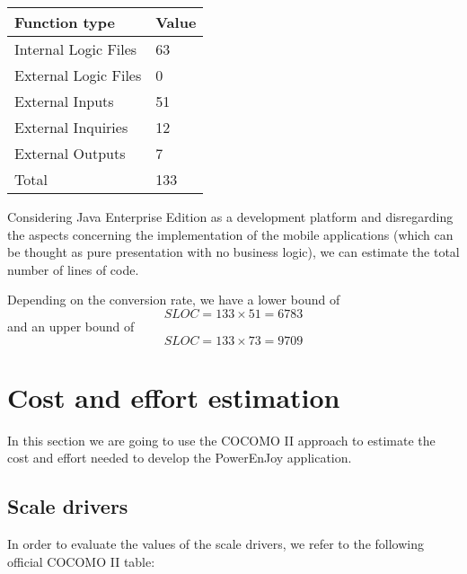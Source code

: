 \begin{table}[H]
	\centering
	\begin{tabular}{|l|l|}
		\hline
		Function type & Value \\
		\hline
		Internal Logic Files & 63 \\
		External Logic Files & 0 \\
		External Inputs & 51 \\
		External Inquiries & 12 \\
		External Outputs & 7 \\
		\hline
		Total & 133 \\
		\hline
	\end{tabular}
\end{table}
Considering Java Enterprise Edition as a development platform and disregarding the aspects concerning the implementation of the mobile applications (which can be thought as pure presentation with no business logic), we can estimate the total number of lines of code.

Depending on the conversion rate, we have a lower bound of \[SLOC = 133 \times 51 = 6783\] and an upper bound of \[SLOC = 133 \times 73 = 9709\]

\section{Cost and effort estimation}
In this section we are going to use the COCOMO II approach to estimate the
cost and effort needed to develop the PowerEnJoy application.

\subsection{Scale drivers}
In order to evaluate the values of the scale drivers, we refer to the following official COCOMO II table:

